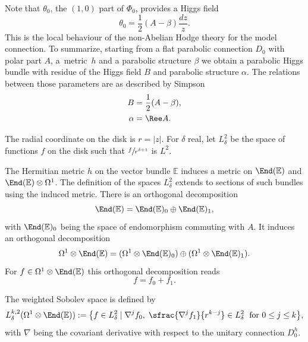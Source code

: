 Note that $\theta_0$, the $(1,0)$ part of $\Phi_0$, provides a Higgs field
\[
\theta_0 = \frac{1}{2} \left(A - \beta\right)\frac{d z}{z}.
\]
This is the local behaviour of the non-Abelian Hodge theory for the model connection.
To summarize, starting from a flat parabolic connection $D_0$ with polar part $A$, a~metric~$h$ and a parabolic structure $\beta$ we obtain a parabolic Higgs bundle with residue of the Higgs field $B$ and parabolic structure $\alpha$. The relations between those parameters are as described by Simpson \cite{Simpson}
\begin{equation}\label{eq_nah_parameters}
\begin{split}
B &= \frac{1}{2}(A - \beta),\\
\alpha &= \Ree A.
\end{split}
\end{equation}

\label{subsect_local_weighted}
\begin{definition}
The radial coordinate on the disk is $r=|z|$. For $\delta$ real, let $L^2_{\delta}$ be the space of functions $f$ on the disk such that $\sfrac{f}{r^{\delta+1}}$ is $L^2$.
\end{definition}
The Hermitian metric $h$ on the vector bundle $\mathbb{E}$ induces a metric on $\End (\mathbb E)$ and $\End (\mathbb E)\otimes \Omega^1$. The definition of the spaces $L^2_{\delta}$ extends to sections of such bundles using the induced metric. There is an orthogonal decomposition
\begin{equation}\label{eq_end_E}
\End(\mathbb{E}) = \End(\mathbb{E})_0 \oplus \End(\mathbb{E})_1,
\end{equation}
with $\End(\mathbb{E})_0$ being the space of endomorphism commuting with $A$. It induces an orthogonal decomposition
\[
\Omega^1 \otimes \End(\mathbb{E}) =(\Omega^1 \otimes \End (\mathbb{E})_0) \oplus(\Omega^1 \otimes \End (\mathbb{E})_1).
\]
For $f\in \Omega^1\otimes \End(\mathbb{E}) $ this orthogonal decomposition reads
\[
f=f_0 +f_1.
\]

\begin{definition}
The weighted Sobolev space is defined by
\[
L^{k,2}_{\delta}(\Omega^1\otimes\End (\mathbb{E})) :=\bigl\lbrace f \in L^2_{\delta} \mid \nabla^j f_0, \; \sfrac{\nabla^j f_1}{r^{k-j}} \in L^{2}_{\delta} \; \text{ for }0\le j \le k\bigr\rbrace,
\]
with $\nabla$ being the covariant derivative with respect to the unitary connection $D_0^h$.
\end{definition}

